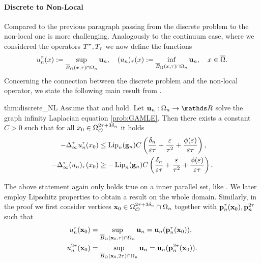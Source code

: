 \paragraph{Discrete to Non-Local} Compared to the previous paragraph passing from the discrete problem to the non-local one is more challenging. Analogously to the continuum case, where we considered the operators $T^\tau,T_\tau$ we now define the functions
%
\begin{align}\label{eq:discr_extension}
    u_n^\tau(x):=\sup_{\overline{B}_\Omega(x,\tau)\cap\Omega_n}\mathbf{u}_n,\quad
    (u_n)_\tau(x):=\inf_{\overline{B}_\Omega(x,\tau)\cap\Omega_n}\mathbf{u}_n,\quad
    x\in\overline{\Omega}.
\end{align}%
%
%
Concerning the connection between the discrete problem and the non-local operator, we state the following main result from \cite{bungert2021uniform}.
%
\begin{theorem}{\cite[Th. 5.13]{bungert2021uniform}}{thm:discrete_NL}
Assume that  and  hold.
Let $\vec u_n:\domain_n\to\R$ solve the graph infinity Laplacian equation \cref{prob:GAMLE}.
Then there exists a constant $C>0$ such that for all $x_0\in\Omega_{\mathcal{O}}^{2\tau+3\delta_n}$ it holds
\begin{subequations}\label{ineq:consist_bounds}
\begin{align}
    \label{ineq:bound_subharmonic}
    -\Delta_\infty^\tau u_n^\tau(x_0) 
    &\leq 
    \operatorname{Lip}_n(\mathbf{g}_n)C\left(\frac{\delta_n}{\varepsilon\tau} + \frac{\varepsilon}{\tau^2}
    +
    \frac{\phi(\varepsilon)}{\varepsilon\tau}
    \right),
    \\
    \label{ineq:bound_superharmonic}
    -\Delta_\infty^\tau (u_n)_\tau(x_0) 
    &\geq
    -
    \operatorname{Lip}_n(\mathbf{g}_n)C\left(\frac{\delta_n}{\varepsilon\tau} + \frac{\varepsilon}{\tau^2}
    +
    \frac{\phi(\varepsilon)}{\varepsilon\tau}
    \right).
\end{align}
\end{subequations}
\end{theorem}
%
\noindent%
The above statement again only holds true on a inner parallel set, like \cite[Lem. 4.6]{bungert2021uniform}. We later employ Lipschitz properties to obtain a result on the whole domain. Similarly, in the proof we first consider vertices $\mathbf{x}_0\in\Omega_{\mathcal{O}}^{2\tau+3\delta_n}\cap \Omega_n$ together with $\mathbf{p}_n^\tau(\mathbf{x}_0),\mathbf{p}^{2\tau}_n$ such that
%
\begin{align*}
u_n^\tau(\mathbf{x}_0)
&=
\sup_{\overline{B}_\Omega(\mathbf{x}_0,\tau) \cap \Omega_n} \mathbf{u}_n 
= 
\mathbf{u}_n (\mathbf{p}_n^\tau(\mathbf{x}_0)),
\\
u_n^{2\tau}(\mathbf{x}_0)
&=
\sup_{\overline{B}_\Omega(\mathbf{x}_0,2\tau) \cap \Omega_n} \mathbf{u}_n 
= 
\mathbf{u}_n (\mathbf{p}_n^{2\tau}(\mathbf{x}_0)).
\end{align*}
